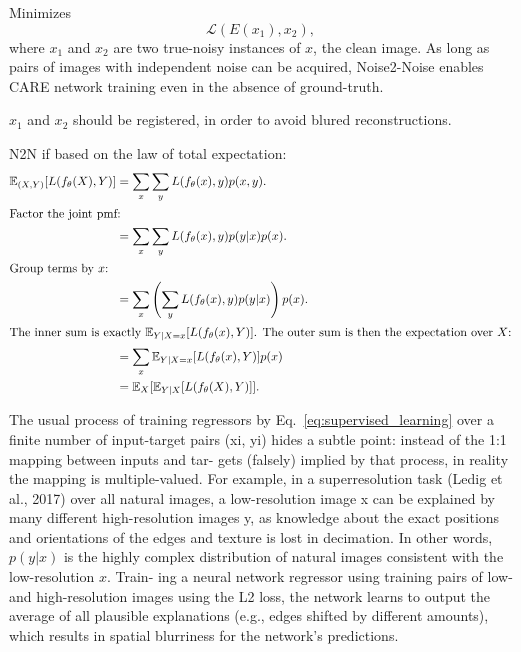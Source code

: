 Minimizes
\begin{equation}
  {\mathcal L}(E(x_1),x_2),
\end{equation}
where $x_1$ and $x_2$ are two true-noisy instances of $x$, the clean
image. As long as pairs of images with independent noise can be
acquired, Noise2-Noise enables CARE network training even in the
absence of ground-truth. %

$x_1$ and $x_2$ should be registered, in order to avoid blured
reconstructions. %

N2N if based on the law of total expectation:
\begin{align*}
\mathbb{E}_{(X,Y)}[L(f_{\theta}(X),Y)] &= \sum_{x}\sum_{y}L(f_{\theta}(x),y) p(x,y). \\
\intertext{Factor the joint pmf:}
&= \sum_{x}\sum_{y}L(f_{\theta}(x),y) p(y|x) p(x). \\
\intertext{Group terms by $x$:}
&= \sum_{x}\left(\sum_{y}L(f_{\theta}(x),y) p(y|x)\right) p(x). \\
\intertext{The inner sum is exactly $\mathbb{E}_{Y|X=x}[L(f_{\theta}(x),Y)]$. The outer sum is then the expectation over $X$:}
&= \sum_{x} \mathbb{E}_{Y|X=x}[L(f_{\theta}(x),Y)] p(x) \\
                                       &= \mathbb{E}_{X}[\mathbb{E}_{Y|X}[L(f_{\theta}(X),Y)]].
                                         \label{eq:5}
\end{align*}

The usual process of training regressors by
Eq.~\ref{eq:supervised_learning} over a finite number of input-target
pairs (xi, yi) hides a subtle point: instead of the 1:1 mapping
between inputs and tar- gets (falsely) implied by that process, in
reality the mapping is multiple-valued. For example, in a superresolution task
(Ledig et al., 2017) over all natural images, a low-resolution
image x can be explained by many different high-resolution
images y, as knowledge about the exact positions and orientations of the edges and texture is lost in decimation. In
other words, $p(y|x)$ is the highly complex distribution of
natural images consistent with the low-resolution $x$. Train-
ing a neural network regressor using training pairs of low-
and high-resolution images using the L2 loss, the network
learns to output the average of all plausible explanations
(e.g., edges shifted by different amounts), which results in
spatial blurriness for the network’s predictions.

